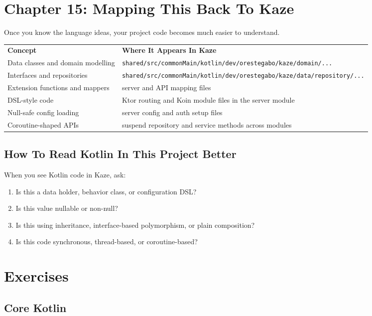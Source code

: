 \documentclass[11pt,a4paper]{article}
\begin{document}
\section{Chapter 15: Mapping This Back To Kaze}

Once you know the language ideas, your project code becomes much easier to understand.

\begin{longtable}{p{} p{}}
\textbf{Concept} & \textbf{Where It Appears In Kaze} \\
Data classes and domain modelling & \texttt{shared/src/commonMain/kotlin/dev/orestegabo/kaze/domain/...} \\
Interfaces and repositories & \texttt{shared/src/commonMain/kotlin/dev/orestegabo/kaze/data/repository/...} \\
Extension functions and mappers & server and API mapping files \\
DSL-style code & Ktor routing and Koin module files in the server module \\
Null-safe config loading & server config and auth setup files \\
Coroutine-shaped APIs & suspend repository and service methods across modules \\
\end{longtable}

\subsection{How To Read Kotlin In This Project Better}

When you see Kotlin code in Kaze, ask:
\begin{enumerate}
    \item Is this a data holder, behavior class, or configuration DSL?
    \item Is this value nullable or non-null?
    \item Is this using inheritance, interface-based polymorphism, or plain composition?
    \item Is this code synchronous, thread-based, or coroutine-based?
\end{enumerate}

\section{Exercises}

\subsection{Core Kotlin}
\end{document}
